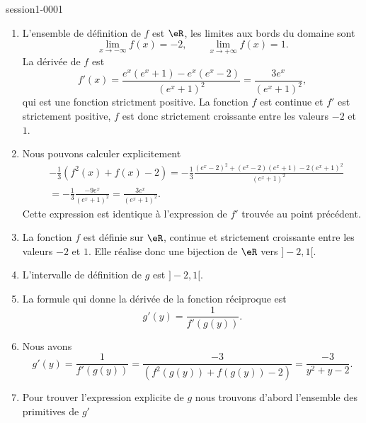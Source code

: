 
\begin{corrige}{session1-0001}

\begin{enumerate}
\item L'ensemble de définition de $f$ est $\eR$, les limites aux bords du domaine sont 
  \begin{equation*}
    \lim_{x\to -\infty} f(x) = -2 , \qquad \lim_{x\to +\infty} f(x) = 1.
  \end{equation*}
La d\'eriv\'ee de $f$ est 
\begin{equation*}
  f'(x) = \frac{e^x(e^x+1)-e^x(e^x-2)}{(e^x+1)^2} =  \frac{3e^x}{(e^x+1)^2},
\end{equation*}
qui est une fonction strictment positive. La fonction $f$ est continue et $f'$ est strictement positive, $f$ est donc strictement croissante entre les valeurs $-2$ et $1$. 
\item Nous pouvons calculer explicitement 
  \begin{align*} 
 &    -\frac{1}{3}\left(f^2(x) + f(x)-2\right) = -\frac{1}{3} \frac{(e^x-2)^2 + (e^x-2)(e^x+1)-2(e^x+1)^2}{(e^x+1)^2} \\
&= -\frac{1}{3}\frac{-9e^x}{(e^x+1)^2} = \frac{3e^x}{(e^x+1)^2}.
  \end{align*}
Cette expression est identique \`a l'expression de $f'$ trouv\'ee au point pr\'ec\'edent. 
\item La fonction $f$ est d\'efinie sur $\eR$, continue et  strictement croissante entre les valeurs $-2$ et $1$. Elle r\'ealise donc une bijection de $\eR$ vers $]-2,1[$. 
\item L'intervalle de définition de $g$ est $]-2,1[$. 
\item La formule qui donne la dérivée de la fonction réciproque est 
  \begin{equation*}
    g'(y) = \frac{1}{f'(g(y))}.
  \end{equation*}
\item  Nous avons 
  \begin{equation*}
    g'(y) = \frac{1}{f'(g(y))} =\frac{-3}{\left(f^2(g(y)) + f(g(y))-2\right)} = \frac{-3}{y^2 +y-2}.
  \end{equation*}
\item Pour trouver l'expression explicite de $g$ nous trouvons d'abord l'ensemble des primitives de $g'$
 \begin{equation*}

\end{equation*}
\end{enumerate}
\end{corrige}
